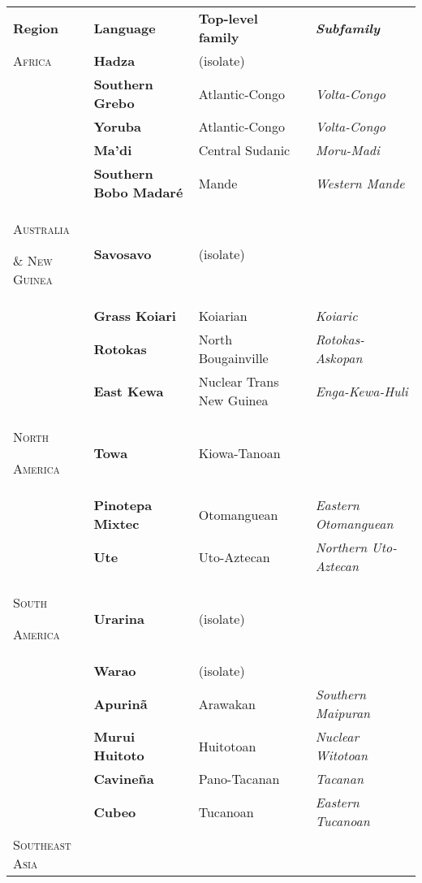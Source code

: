 \begin{table}
\begin{tabularx}{\textwidth}{XXXX}
\lsptoprule

\textbf{Region} & \textbf{Language} & \textbf{Top-level family} & \textbf{\textit{Subfamily}}\\
\textsc{Africa} & \textbf{Hadza} & (isolate) & \\
\hhline{-~~~} & \textbf{Southern Grebo} & Atlantic-Congo & \textit{Volta-Congo}\\
& \textbf{Yoruba} & Atlantic-Congo & \textit{Volta-Congo}\\
& \textbf{Ma’di} & Central Sudanic & \textit{Moru-Madi}\\
& \textbf{Southern Bobo Madaré} & Mande & \textit{Western Mande}\\
\textsc{Australia} 

\textsc{\&} \textsc{New} \textsc{Guinea} & \textbf{Savosavo} & (isolate) & \\
\hhline{-~~~} & \textbf{Grass Koiari} & Koiarian & \textit{Koiaric}\\
& \textbf{Rotokas} & North Bougainville & \textit{Rotokas-Askopan}\\
& \textbf{East Kewa} & Nuclear Trans New Guinea & \textit{Enga-Kewa-Huli}\\
\textsc{North} 

\textsc{America} & \textbf{Towa} & Kiowa-Tanoan & \\
\hhline{-~~~} & \textbf{Pinotepa Mixtec} & Otomanguean & \textit{Eastern Otomanguean}\\
& \textbf{Ute} & Uto-Aztecan & \textit{Northern Uto-Aztecan}\\
\textsc{South} 

\textsc{America} & \textbf{Urarina} & (isolate) & \\
\hhline{-~~~} & \textbf{Warao} & (isolate) & \\
& \textbf{Apurinã} & Arawakan & \textit{Southern Maipuran}\\
& \textbf{Murui Huitoto} & Huitotoan & \textit{Nuclear Witotoan}\\
& \textbf{Cavineña} & Pano-Tacanan & \textit{Tacanan}\\
& \textbf{Cubeo} & Tucanoan & \textit{Eastern Tucanoan}\\
\textsc{Southeast} \textsc{Asia} 


\end{tabularx}
\end{table}
